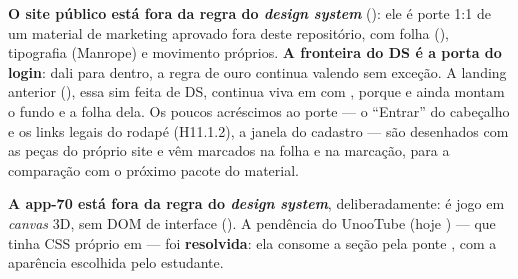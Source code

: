 \begin{decisao}
\textbf{O site público \cd{/} está fora da regra do \emph{design system}}
(): ele é porte 1:1 de um material de marketing aprovado fora
deste repositório, com folha (), tipografia
(Manrope) e movimento próprios. \textbf{A fronteira do DS é a porta do login}:
dali para dentro, a regra de ouro continua valendo sem exceção. A landing
anterior (), essa sim feita de DS, continua viva em
 com , porque  e 
ainda montam o fundo e a folha dela. Os poucos acréscimos ao porte --- o
\enquote{Entrar} do cabeçalho e os links legais do rodapé (H11.1.2), a janela do
cadastro --- são desenhados com as peças do próprio site e vêm marcados na folha
e na marcação, para a comparação com o próximo pacote do material.
\end{decisao}

\begin{decisao}
\textbf{A app-70 está fora da regra do \emph{design system}}, deliberadamente:
é jogo em \emph{canvas} 3D, sem DOM de interface (). A pendência do
UnooTube (hoje ) --- que tinha CSS próprio em  --- foi
\textbf{resolvida}: ela consome a seção  pela ponte
, com a aparência escolhida pelo estudante.
\end{decisao}
